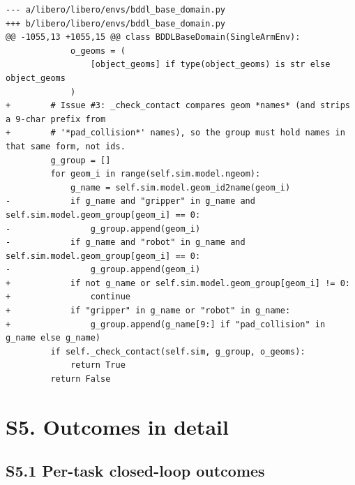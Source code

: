 \documentclass{article}
\begin{document}
\begin{lstlisting}
--- a/libero/libero/envs/bddl_base_domain.py
+++ b/libero/libero/envs/bddl_base_domain.py
@@ -1055,13 +1055,15 @@ class BDDLBaseDomain(SingleArmEnv):
             o_geoms = (
                 [object_geoms] if type(object_geoms) is str else object_geoms
             )
+        # Issue #3: _check_contact compares geom *names* (and strips a 9-char prefix from
+        # '*pad_collision*' names), so the group must hold names in that same form, not ids.
         g_group = []
         for geom_i in range(self.sim.model.ngeom):
             g_name = self.sim.model.geom_id2name(geom_i)
-            if g_name and "gripper" in g_name and self.sim.model.geom_group[geom_i] == 0:
-                g_group.append(geom_i)
-            if g_name and "robot" in g_name and self.sim.model.geom_group[geom_i] == 0:
-                g_group.append(geom_i)
+            if not g_name or self.sim.model.geom_group[geom_i] != 0:
+                continue
+            if "gripper" in g_name or "robot" in g_name:
+                g_group.append(g_name[9:] if "pad_collision" in g_name else g_name)
         if self._check_contact(self.sim, g_group, o_geoms):
             return True
         return False
\end{lstlisting}

\section*{S5. Outcomes in detail}

\subsection*{S5.1 Per-task closed-loop outcomes}

\begin{table}[H]\centering\footnotesize
\suppstudyOne
\caption{Study~1 confirmatory states (layouts 3 and 4, states 25--49). Counts of contact, near-still (including contact episodes) and success. The 6- and 12-epoch rows are the exploratory dose run (S6.1). No policy completed these tasks.}
\end{table}

\begin{table}[H]\centering\scriptsize
\setlength{\tabcolsep}{3pt}
\suppstudyTwo
\caption{Study~2 test states (15 per task). Cells: contact/near-still. $^h$: the larger (hairbrush) hand. $^\dagger$: post hoc run. Totals out of 150.}
\end{table}
\end{document}
